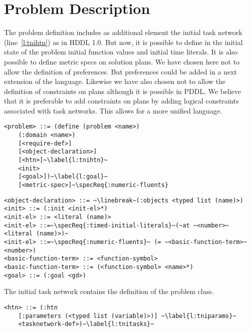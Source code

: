 \documentclass[letterpaper]{article} %
\begin{document}

\section{Problem Description}

%
%
The problem definition includes as additional element the initial task network (line~\ref{l:tnihtn}) as in HDDL 1.0. But now, it is possible to define in the initial state of the problem initial function values and initial time literals. It is also possible to define metric specs on solution plans. We have chosen here not to allow the definition of preferences. But preferences could be added in a next extension of the language. Likewise we have also chosen not to allow the definition of constraints on plans although it is possible in PDDL. We believe that it is preferable to add constraints on plans by adding logical constraints associated with task networks. This allows for a more unified language.

\begin{lstlisting}[firstnumber=last, escapechar=~]
<problem> ::= (define (problem <name>)
    (:domain <name>)
    [<require-def>]
    [<object-declaration>]
    [<htn>]~\label{l:tnihtn}~
    <init>
    [<goal>])~\label{l:goal}~
    [<metric-spec>]~\specReq{:numeric-fluents}
\end{lstlisting}

\begin{lstlisting}[firstnumber=last, escapechar=~]
<object-declaration> ::= ~\linebreak~(:objects <typed list (name)>)
<init> ::= (:init <init-el>*)
<init-el> ::= <literal (name)>
<init-el> ::=~\specReq{:timed-initial-literals}~(~at ~<number>~ <literal (name)>)~
<init-el> ::=~\specReq{:numeric-fluents}~ (= ~<basic-function-term>~ <number>)
<basic-function-term> ::= <function-symbol>
<basic-function-term> ::= (<function-symbol> <name>*)
<goal> ::= (:goal <gd>)
\end{lstlisting}

The initial task network contains the definition of the problem class.

\begin{lstlisting}[firstnumber=last, escapechar=~]
<htn> ::= (:htn
    [:parameters (<typed list (variable)>)] ~\label{l:tniparams}~
    <tasknetwork-def>)~\label{l:tnitasks}~
\end{lstlisting} %
\end{document}
